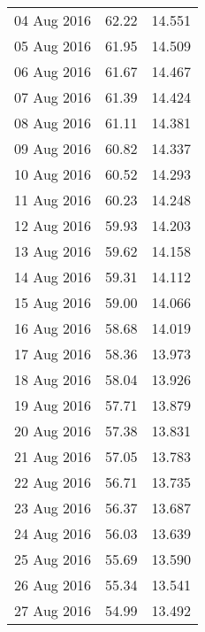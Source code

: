 \documentclass[11pt,a4paper,twoside]{article}
\begin{document}
\begin{longtable}{lcc}
04 Aug 2016                    & 62.22                & 14.551    \\
05 Aug 2016                    & 61.95                & 14.509    \\
06 Aug 2016                    & 61.67                & 14.467     \\
07 Aug 2016                    & 61.39                & 14.424     \\
08 Aug 2016                    & 61.11                & 14.381     \\
09 Aug 2016                    & 60.82                & 14.337     \\
10 Aug 2016                    & 60.52                & 14.293     \\
11 Aug 2016                    & 60.23                & 14.248     \\
12 Aug 2016                    & 59.93                & 14.203     \\
13 Aug 2016                    & 59.62                & 14.158     \\
14 Aug 2016                    & 59.31                & 14.112     \\
15 Aug 2016                    & 59.00                & 14.066     \\
16 Aug 2016                    & 58.68                & 14.019     \\
17 Aug 2016                    & 58.36                & 13.973     \\
18 Aug 2016                    & 58.04                & 13.926     \\
19 Aug 2016                    & 57.71                & 13.879     \\
20 Aug 2016                    & 57.38                & 13.831     \\
21 Aug 2016                    & 57.05                & 13.783     \\
22 Aug 2016                    & 56.71                & 13.735     \\
23 Aug 2016                    & 56.37                & 13.687     \\
24 Aug 2016                    & 56.03                & 13.639     \\
25 Aug 2016                    & 55.69                & 13.590     \\
26 Aug 2016                    & 55.34                & 13.541     \\
27 Aug 2016                    & 54.99                & 13.492     \\

\end{longtable}
\end{document}
